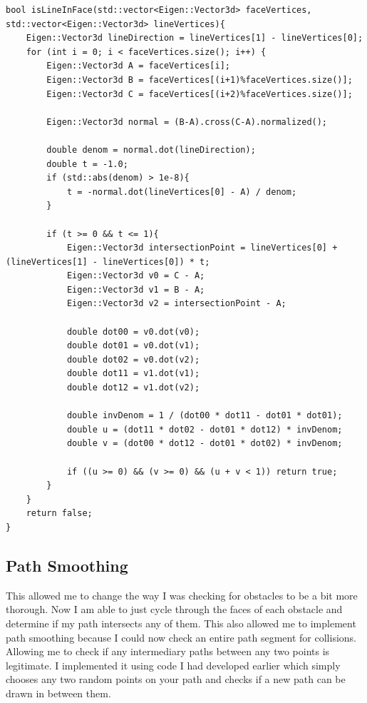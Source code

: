 \documentclass{article}
\begin{document}
\begin{lstlisting}[style=cppstyle]
bool isLineInFace(std::vector<Eigen::Vector3d> faceVertices, std::vector<Eigen::Vector3d> lineVertices){
    Eigen::Vector3d lineDirection = lineVertices[1] - lineVertices[0];
    for (int i = 0; i < faceVertices.size(); i++) {
        Eigen::Vector3d A = faceVertices[i];
        Eigen::Vector3d B = faceVertices[(i+1)%faceVertices.size()];
        Eigen::Vector3d C = faceVertices[(i+2)%faceVertices.size()];

        Eigen::Vector3d normal = (B-A).cross(C-A).normalized();

        double denom = normal.dot(lineDirection);
        double t = -1.0;
        if (std::abs(denom) > 1e-8){
            t = -normal.dot(lineVertices[0] - A) / denom;
        }

        if (t >= 0 && t <= 1){
            Eigen::Vector3d intersectionPoint = lineVertices[0] + (lineVertices[1] - lineVertices[0]) * t;
            Eigen::Vector3d v0 = C - A;
            Eigen::Vector3d v1 = B - A;
            Eigen::Vector3d v2 = intersectionPoint - A;

            double dot00 = v0.dot(v0);
            double dot01 = v0.dot(v1);
            double dot02 = v0.dot(v2);
            double dot11 = v1.dot(v1);
            double dot12 = v1.dot(v2);

            double invDenom = 1 / (dot00 * dot11 - dot01 * dot01);
            double u = (dot11 * dot02 - dot01 * dot12) * invDenom;
            double v = (dot00 * dot12 - dot01 * dot02) * invDenom;

            if ((u >= 0) && (v >= 0) && (u + v < 1)) return true;
        }
    }
    return false;
}
\end{lstlisting}

\subsection*{Path Smoothing}

This allowed me to change the way I was checking for obstacles to be a bit more thorough.
Now I am able to just cycle through the faces of each obstacle and determine if my path intersects any of them.
This also allowed me to implement path smoothing because I could now check an entire path segment for collisions.
Allowing me to check if any intermediary paths between any two points is legitimate.
I implemented it using code I had developed earlier which simply chooses any two random points on your path and checks if a new path can be drawn in between them.
\end{document}

